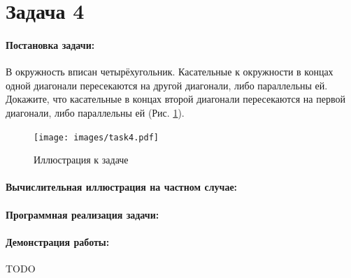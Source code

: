 {
   \section*{Задача 4}
   \paragraph{Постановка задачи:}
   В окружность вписан четырёхугольник. Касательные к окружности
   в концах одной диагонали пересекаются на другой диагонали,
   либо параллельны ей. Докажите, что касательные в концах второй
   диагонали пересекаются на первой диагонали, либо параллельны ей (Рис. \ref{t4:im}).
   \begin{figure}[h]
      \centering
      \texttt{[image: images/task4.pdf]}
      \caption{Иллюстрация к задаче}
      \label{t4:im}
   \end{figure}
   \paragraph{Вычислительная иллюстрация на частном случае:}
   \paragraph{Программная реализация задачи:}
   \paragraph{Демонстрация работы:}
   TODO %
}
